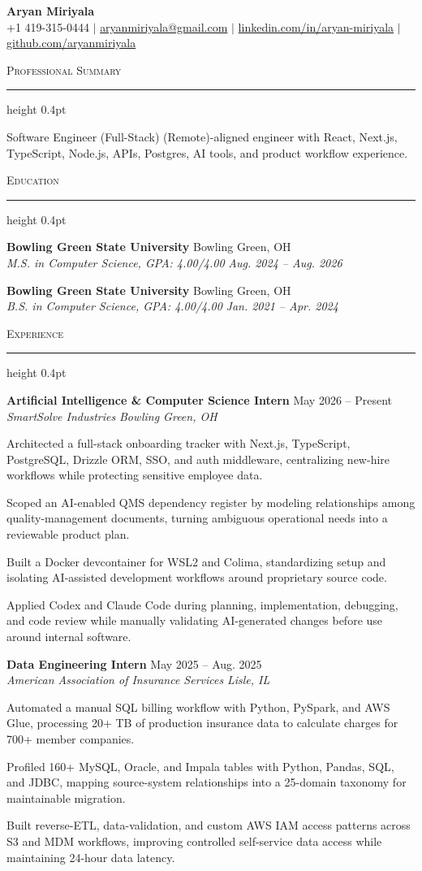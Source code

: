 \documentclass[letterpaper,11pt]{article}
\newcommand{\resumesection}[1]{%
  \par\vspace{2pt}%
  {\large\scshape #1}\par\vspace{2pt}%
  \hrule height 0.4pt\vspace{2pt}%
}
\newcommand{\resumeSubheading}[4]{
  \textbf{#1} \hfill #2\\
  \textit{#3} \hfill \textit{#4}
}
\begin{document}
\begin{center}
  {\LARGE \textbf{Aryan Miriyala}}\\[-1pt]
  \small
  +1 419-315-0444 $|$
  \href{mailto:aryanmiriyala@gmail.com}{aryanmiriyala@gmail.com} $|$
  \href{https://www.linkedin.com/in/aryan-miriyala-7788a21b6/}{linkedin.com/in/aryan-miriyala} $|$
  \href{https://github.com/aryanmiriyala}{github.com/aryanmiriyala}
\end{center}\vspace{-10pt}

\resumesection{Professional Summary}
Software Engineer (Full-Stack) (Remote)-aligned engineer with React, Next.js, TypeScript, Node.js, APIs, Postgres, AI tools, and product workflow experience.

\resumesection{Education}
\resumeSubheading
{Bowling Green State University}{Bowling Green, OH}
{M.S. in Computer Science, GPA: 4.00/4.00}{Aug. 2024 -- Aug. 2026}

\resumeSubheading
{Bowling Green State University}{Bowling Green, OH}
{B.S. in Computer Science, GPA: 4.00/4.00}{Jan. 2021 -- Apr. 2024}

\resumesection{Experience}
\resumeSubheading
{Artificial Intelligence \& Computer Science Intern}{May 2026 -- Present}
{SmartSolve Industries}{Bowling Green, OH}
\begin{tightitemize}
  \item Architected a full-stack onboarding tracker with Next.js, TypeScript, PostgreSQL, Drizzle ORM, SSO, and auth middleware, centralizing new-hire workflows while protecting sensitive employee data.
  \item Scoped an AI-enabled QMS dependency register by modeling relationships among quality-management documents, turning ambiguous operational needs into a reviewable product plan.
  \item Built a Docker devcontainer for WSL2 and Colima, standardizing setup and isolating AI-assisted development workflows around proprietary source code.
  \item Applied Codex and Claude Code during planning, implementation, debugging, and code review while manually validating AI-generated changes before use around internal software.
\end{tightitemize}

\resumeSubheading
{Data Engineering Intern}{May 2025 -- Aug. 2025}
{American Association of Insurance Services}{Lisle, IL}
\begin{tightitemize}
  \item Automated a manual SQL billing workflow with Python, PySpark, and AWS Glue, processing 20+ TB of production insurance data to calculate charges for 700+ member companies.
  \item Profiled 160+ MySQL, Oracle, and Impala tables with Python, Pandas, SQL, and JDBC, mapping source-system relationships into a 25-domain taxonomy for maintainable migration.
  \item Built reverse-ETL, data-validation, and custom AWS IAM access patterns across S3 and MDM workflows, improving controlled self-service data access while maintaining 24-hour data latency.
\end{tightitemize}
\end{document}
